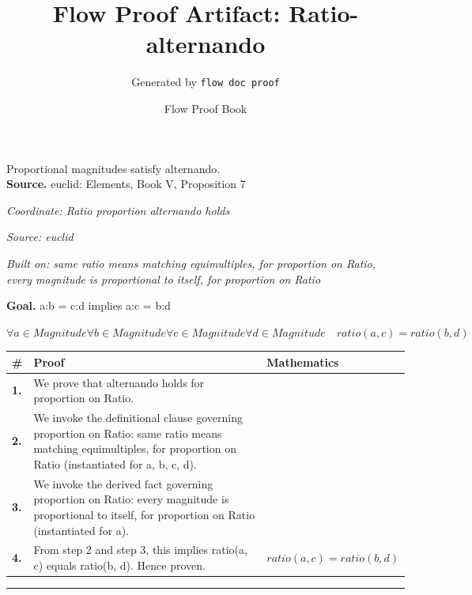 \documentclass[11pt]{article}
\title{Flow Proof Artifact: Ratio-alternando}
\author{Generated by \texttt{flow doc proof}}
\date{Flow Proof Book}
\theoremstyle{definition}
\begin{document}
\maketitle
Proportional magnitudes satisfy alternando.\\[0.5em]
\textbf{Source.} euclid: Elements, Book V, Proposition 7\\[0.5em]
\bigskip
{}\par
\smallskip\noindent\textit{Coordinate: Ratio \cdot proportion \cdot alternando holds}\par
\smallskip\noindent\textit{Source: euclid}\par
\smallskip\noindent\textit{Built on: same ratio means matching equimultiples, for proportion on Ratio, every magnitude is proportional to itself, for proportion on Ratio}\par
\medskip
\noindent\textbf{Goal.} a:b = c:d implies a:c = b:d\par
\noindent$\displaystyle \forall a \in Magnitude \forall b \in Magnitude \forall c \in Magnitude \forall d \in Magnitude\quad ratio(a, c) = ratio(b, d)$\par
\medskip
\noindent
\begin{tabular}{@{} >{\raggedright\arraybackslash}p{} >{\raggedright\arraybackslash}p{} >{\raggedleft\arraybackslash}p{} @{}}
\textbf{\#} & \textbf{Proof} & \textbf{Mathematics} \\
\midrule
\textbf{1.} & We prove that alternando holds for proportion on Ratio. & \\[0.45em]
\textbf{2.} & We invoke the definitional clause governing proportion on Ratio: same ratio means matching equimultiples, for proportion on Ratio (instantiated for a, b, c, d). & \\[0.45em]
\textbf{3.} & We invoke the derived fact governing proportion on Ratio: every magnitude is proportional to itself, for proportion on Ratio (instantiated for a). & \\[0.45em]
\textbf{4.} & From step 2 and step 3, this implies ratio(a, c) equals ratio(b, d). Hence proven. & $\displaystyle ratio(a, c) = ratio(b, d)$ \\[0.45em]
\bottomrule
\end{tabular}
\label{thm:Ratio-proportion-alternando_holds}
\par\medskip\hrule
\end{document}
